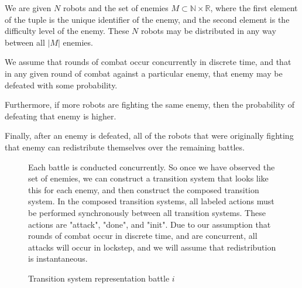 \documentclass[11pt]{article}
\theoremstyle{definition}
\newcommand{\abs}[1]{\left\vert{#1}\right\vert}
\begin{document}
\begin{description}
We are given $N$ robots and the set of enemies
$M \subset \mathbb{N} \times \mathbb{R}$,
where the first element of the tuple is the unique identifier
of the enemy, and the second element is the difficulty level
of the enemy. These $N$ robots may be distributed
in any way between all $\abs{M}$ enemies.

We assume that rounds of combat occur concurrently in discrete time,
and that in any given round of combat against a
particular enemy, that enemy may be defeated
with some probability.

Furthermore, if more robots are fighting
the same enemy, then the probability of
defeating that enemy is higher.

Finally, after an enemy is defeated, all of
the robots that were originally fighting
that enemy can redistribute themselves
over the remaining battles.

\begin{figure}[ht]
    \caption{Transition system representation battle $i$}
    \label{tikz:battle}
    \begin{center}
    \end{center}
    \small
    \justify
    \par
    Each battle is conducted concurrently. So once we
    have observed the set of enemies, we can construct
    a transition system that looks like this for each enemy,
    and then construct the composed transition system.
    In the composed transition systems, all labeled actions
    must be performed synchronously between all
    transition systems. These actions are "attack", "done", and "init".
    Due to our assumption that rounds of combat
    occur in discrete time, and are concurrent,
    all attacks will occur in lockstep, and
    we will assume that redistribution is instantaneous.


\end{figure}
\end{description}
\end{document}
